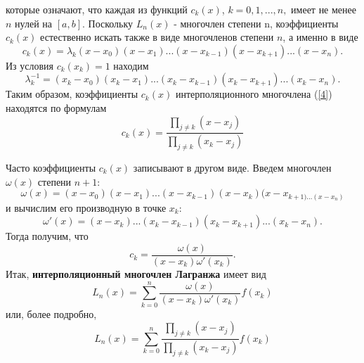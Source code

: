 которые означают, что каждая из функций $c_k(x)$, $k=0,1,...,n,$ имеет не менее $n$ нулей на $[a,b]$. Поскольку $L_n(x)$ - многочлен степени n, коэффициенты $c_k(x)$ естественно искать также в виде многочленов степени $n$, а именно в виде
\begin{equation*}
    c_k(x) = \lambda_k(x-x_0)(x-x_1)...(x-x_{k-1})(x-x_{k+1})...(x-x_n).
\end{equation*}
Из условия $c_k(x_k)=1$ находим
\begin{equation*}
    \lambda_k^{-1}=(x_k-x_0)(x_k-x_1)...(x_k-x_{k-1})(x_k-x_{k+1})...(x_k-x_n).
\end{equation*}
Таким образом, коэффициенты $c_k(x)$ интерполяционного многочлена (\ref{4}) находятся по формулам
\begin{equation}\label{5}
    c_k(x) = \frac{\displaystyle \prod_{j \neq k}(x-x_j)}{\displaystyle \prod_{j \neq k}(x_k-x_j)}
\end{equation}

Часто коэффициенты $c_k(x)$ записывают в другом виде. Введем многочлен $\omega(x)$ степени $n+1$:
\begin{equation}
    \omega(x) = (x-x_0)(x-x_1)...(x-x_{k-1})(x-x_k)(x-x_{k+1)...(x-x_n)}
\end{equation}
и вычислим его производную в точке $x_k$:
\begin{equation*}
    \omega '(x) = (x-x_k)...(x_k - x_{k-1})(x_k-x_{k+1})...(x_k-x_n).
\end{equation*}
Тогда получим, что 
\begin{equation*}
    c_k = \frac{\omega (x)}{(x-x_k)\omega ' (x_k)}.
\end{equation*}
Итак, \textbf{интерполяционный многочлен Лагранжа} имеет вид
\begin{equation}
    L_n(x) = \displaystyle \sum_{k=0}^{n} \frac{\omega(x)}{(x-x_k)\omega ' (x_k)} f(x_k)
\end{equation}
или, более подробно,
\begin{equation}
    L_n(x) = \displaystyle \sum_{k=0}^{n} \frac{\displaystyle \prod_{j \neq k}(x-x_j)}{\displaystyle \prod_{j \neq k}(x_k-x_j)} f(x_k)
\end{equation} 

